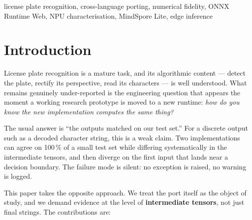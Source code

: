 \documentclass[journal]{IEEEtran}
\begin{document}
\begin{abstract}
with an on-device characterisation of the HiSilicon Kirin 8020 NPU via MindSpore
Lite 2.6.0 $\rightarrow$ NNRT on a nova~14~Pro, reporting measured P50 latencies
for six backbone networks. The speedup ranges monotonically from \textbf{13.11$\times$}
(ResNet-50, 6.02\,ms NPU vs 78.90\,ms CPU) down to \textbf{0.98$\times$} (fully
INT8-quantised MobileNetV2), demonstrating that small graphs gain nothing from
NPU offload because fixed delegation overhead cannot be amortised. We also
document a runtime defect in which FP16 output buffers are declared as FP32,
producing $10^{21}$-magnitude garbage that is corrected by inserting a trailing
\texttt{Cast} node (relative error $7.78\times10^{18}\,\% \rightarrow
0.015\,\%$).
\end{abstract}

\begin{IEEEkeywords}
license plate recognition, cross-language porting, numerical fidelity, ONNX
Runtime Web, NPU characterisation, MindSpore Lite, edge inference
\end{IEEEkeywords}

\section{Introduction}

License plate recognition is a mature task, and its algorithmic content ---
detect the plate, rectify its perspective, read its characters --- is well
understood. What remains genuinely under-reported is the engineering question
that appears the moment a working research prototype is moved to a new runtime:
\emph{how do you know the new implementation computes the same thing?}

The usual answer is ``the outputs matched on our test set.'' For a discrete
output such as a decoded character string, this is a weak claim. Two
implementations can agree on 100\,\% of a small test set while differing
systematically in the intermediate tensors, and then diverge on the first input
that lands near a decision boundary. The failure mode is silent: no exception is
raised, no warning is logged.

This paper takes the opposite approach. We treat the port itself as the object of
study, and we demand evidence at the level of \textbf{intermediate tensors}, not
just final strings. The contributions are:
\end{document}
